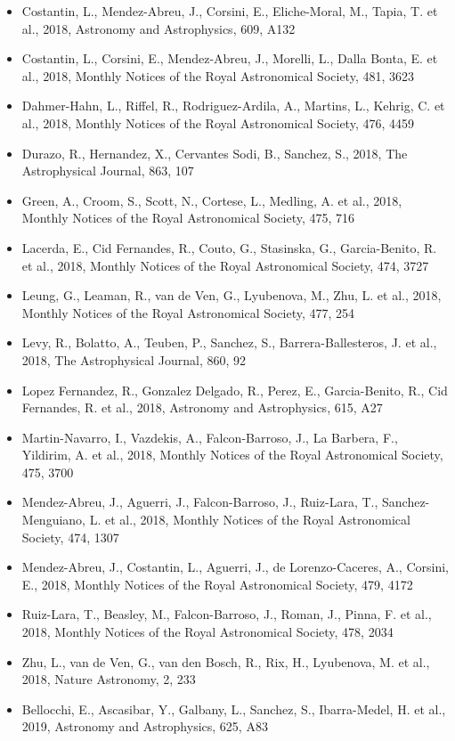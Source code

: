 \documentclass{letter}
\begin{document}
\begin{enumerate}
\begin{itemize}
\item Costantin, L., Mendez-Abreu, J., Corsini, E., Eliche-Moral, M., Tapia, T. et al., 2018, Astronomy and Astrophysics, 609, A132
\item Costantin, L., Corsini, E., Mendez-Abreu, J., Morelli, L., Dalla Bonta, E. et al., 2018, Monthly Notices of the Royal Astronomical Society, 481, 3623
\item Dahmer-Hahn, L., Riffel, R., Rodriguez-Ardila, A., Martins, L., Kehrig, C. et al., 2018, Monthly Notices of the Royal Astronomical Society, 476, 4459
\item Durazo, R., Hernandez, X., Cervantes Sodi, B., Sanchez, S., 2018, The Astrophysical Journal, 863, 107
\item Green, A., Croom, S., Scott, N., Cortese, L., Medling, A. et al., 2018, Monthly Notices of the Royal Astronomical Society, 475, 716
\item Lacerda, E., Cid Fernandes, R., Couto, G., Stasinska, G., Garcia-Benito, R. et al., 2018, Monthly Notices of the Royal Astronomical Society, 474, 3727
\item Leung, G., Leaman, R., van de Ven, G., Lyubenova, M., Zhu, L. et al., 2018, Monthly Notices of the Royal Astronomical Society, 477, 254
\item Levy, R., Bolatto, A., Teuben, P., Sanchez, S., Barrera-Ballesteros, J. et al., 2018, The Astrophysical Journal, 860, 92
\item Lopez Fernandez, R., Gonzalez Delgado, R., Perez, E., Garcia-Benito, R., Cid Fernandes, R. et al., 2018, Astronomy and Astrophysics, 615, A27
\item Martin-Navarro, I., Vazdekis, A., Falcon-Barroso, J., La Barbera, F., Yildirim, A. et al., 2018, Monthly Notices of the Royal Astronomical Society, 475, 3700
\item Mendez-Abreu, J., Aguerri, J., Falcon-Barroso, J., Ruiz-Lara, T., Sanchez-Menguiano, L. et al., 2018, Monthly Notices of the Royal Astronomical Society, 474, 1307
\item Mendez-Abreu, J., Costantin, L., Aguerri, J., de Lorenzo-Caceres, A., Corsini, E., 2018, Monthly Notices of the Royal Astronomical Society, 479, 4172
\item Ruiz-Lara, T., Beasley, M., Falcon-Barroso, J., Roman, J., Pinna, F. et al., 2018, Monthly Notices of the Royal Astronomical Society, 478, 2034
\item Zhu, L., van de Ven, G., van den Bosch, R., Rix, H., Lyubenova, M. et al., 2018, Nature Astronomy, 2, 233
\item Bellocchi, E., Ascasibar, Y., Galbany, L., Sanchez, S., Ibarra-Medel, H. et al., 2019, Astronomy and Astrophysics, 625, A83

\end{itemize}
\end{enumerate}
\end{document}

